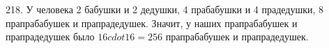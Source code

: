 218. У человека 2 бабушки и 2 дедушки, 4 прабабушки и 4 прадедушки, 8 прапрабабушек и прапрадедушек. Значит, у наших прапрабабушек и прапрадедушек было $16cdot16=256$ прапрабабушек и прапрадедушек.\\
